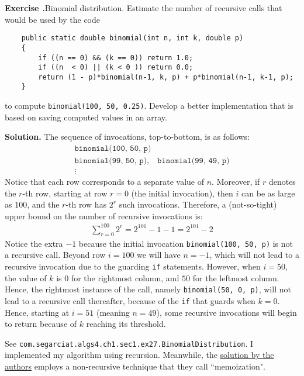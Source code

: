 \documentclass[12pt, a4paper]{article}
\newenvironment{ex}[2][Exercise]
{\par\medskip\noindent \textbf{#1 #2.}}
{\medskip}
\newenvironment{sol}[1][Solution]
{\par\medskip\noindent \textbf{#1.} }
{\medskip}
\begin{document}
	\begin{ex}{27}
		\emph{Binomial distribution}. Estimate the number of recursive calls that would be
		used by the code
		\begin{lstlisting}
	public static double binomial(int n, int k, double p)
	{
		if ((n == 0) && (k == 0)) return 1.0;
		if ((n  < 0) || (k < 0 )) return 0.0;
		return (1 - p)*binomial(n-1, k, p) + p*binomial(n-1, k-1, p);
	}
		\end{lstlisting}
		to compute \texttt{binomial(100, 50, 0.25)}. Develop a better implementation
		that is based on saving computed values in an array.
	\end{ex}
	\begin{sol}
		The sequence of invocations, top-to-bottom, is as follows:
		\begin{align*}
			\texttt{binomial(100, 50, p)}\\
			\texttt{binomial(99, 50, p)},\quad \texttt{binomial(99, 49, p)}\\
			\vdots
		\end{align*}
		Notice that each row corresponds to a separate value of $n$. Moreover, if
		$r$ denotes the $r$-th row, starting at row $r=0$ (the initial invocation),
		then $i$ can be as large as $100$, and the $r$-th row has $2^r$ such invocations.
		Therefore, a (not-so-tight) upper bound on the number of recursive invocations is:
		\begin{align*}
			\sum_{r=0}^{100}2^r = 2^{101}-1-1=2^{101}-2
		\end{align*}
		Notice the extra $-1$ because the initial invocation \texttt{binomial(100, 50, p)}
		is not a recursive call. Beyond row $i=100$ we will have $n=-1$, which will
		not lead to a recursive invocation due to the guarding \texttt{if} statements.
		However, when $i=50$, the value of $k$ is $0$ for the rightmost  column, and $50$
		for the leftmost column. Hence, the rightmost instance of the call, namely
		\texttt{binomial(50, 0, p)}, will not lead to a recursive call thereafter, because
		of the \texttt{if} that guards when $k=0$. Hence, starting at $i=51$ (meaning $n=49$),
		some recursive invocations will begin to return because of $k$ reaching its threshold.
		
		See \texttt{com.segarciat.algs4.ch1.sec1.ex27.BinomialDistribution}. I implemented
		my algorithm using recursion. Meanwhile, the \href{https://algs4.cs.princeton.edu/11model/Binomial.java.html}{solution by the authors}
		employs a non-recursive technique that they call ``memoization".
	\end{sol}
\end{document}
